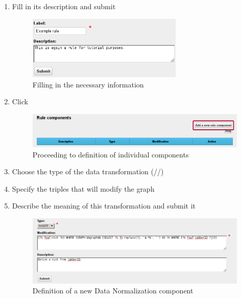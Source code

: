 {\begin{enumerate}[resume]
	\item Fill in its description and submit

\begin{figure}[!ht]
    \centering
    \includegraphics[width=0.7\textwidth]{images/fe-walkthrough-new-raw-rule.png}
    \caption{Filling in the necessary information}
	\label{fig:feWTNewRawRule}
\end{figure}
\FloatBarrier

\vspace*{0.2\textheight}

	\item Click 

\begin{figure}[!ht]
    \centering
    \includegraphics[width=\textwidth]{images/fe-walkthrough-add-component.png}
    \caption{Proceeding to definition of individual components}
	\label{fig:feWTAddComponent}
\end{figure}
\FloatBarrier

\newpage

\vspace*{0.2\textheight}

	\item Choose the type of the data transformation (//)
	\item Specify the triples that will modify the graph
	\item Describe the meaning of this transformation and submit it

\begin{figure}[!ht]
    \centering
    \includegraphics[width=\textwidth]{images/fe-walkthrough-new-component.png}
    \caption{Definition of a new Data Normalization component}
	\label{fig:feWTNewComponent}
\end{figure}
\FloatBarrier


\end{enumerate}}
